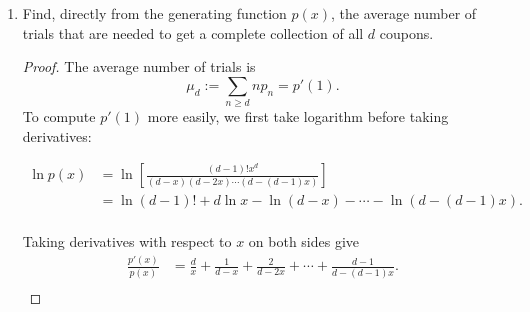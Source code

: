 \documentclass{article}
\begin{document}
\begin{enumerate}[label={(\alph*)}]
\begin{proof}
        Now the ordinary generating function we want is
        \begin{align*}
          p(x) &=\sum_{n\geq d} p_n x^n\\
          &=\sum_{n\geq d} {n-1\brace d-1}\frac{d!}{d^n} x^n\\
          &=d! \sum_{n\geq d} {n-1\brace d-1} \left(\frac{x}{d}\right)^n\\
          &=(d-1)!x \sum_{n\geq d} {n-1\brace d-1}
            \left(\frac{x}{d}\right)^{n-1}\\
          &=(d-1)!x \sum_{n\geq d-1} {n\brace d-1}
            \left(\frac{x}{d}\right)^{n}\\
          &=(d-1)!x B_{d-1}(x/d)\\
          &=(d-1)!x \frac{(x/d)^{d-1}}{(1-x/d)(1-2x/d)\cdots(1-x)}\\
          &=\frac{(d-1)!x^d}{(d-x)(d-2x)\cdots(d-(d-1)x)}.
        \end{align*}
      \end{proof}

    \item Find, directly from the generating function $p(x)$, the average
      number of trials that are needed to get a complete collection of all
      $d$ coupons.

      \begin{proof}
        The average number of trials is
        \[\mu_d :=\sum_{n\geq d} np_n =p'(1).\]
        To compute $p'(1)$ more easily, we first take logarithm before
        taking derivatives:

        \begin{align*}
          \ln{p(x)}
            &=\ln{\left[\frac{(d-1)!x^d}{(d-x)(d-2x)\cdots(d-(d-1)x)}
            \right]}\\
          &=\ln{(d-1)!} +d\ln{x} -\ln{(d-x)} -\cdots -\ln{(d-(d-1)x)}.\\
        \end{align*}

        Taking derivatives with respect to $x$ on both sides give
        \begin{align*}
          \frac{p'(x)}{p(x)} &=\frac{d}{x} +\frac{1}{d-x} +\frac{2}{d-2x}
            +\cdots +\frac{d-1}{d-(d-1)x}.\\
        \end{align*}


\end{proof}
\end{enumerate}
\end{document}
